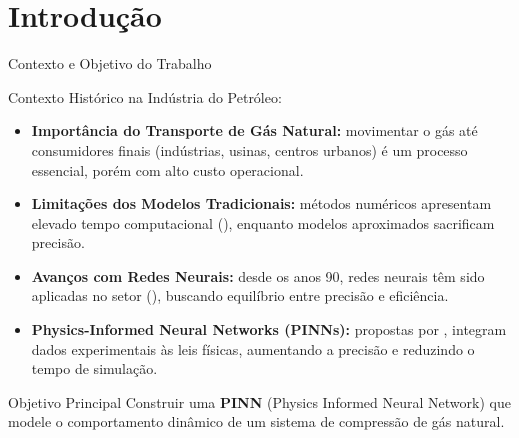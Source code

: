\section{Introdução}

\begin{frame}{Contexto e Objetivo do Trabalho}
    \scriptsize
    \begin{block}{Contexto Histórico na Indústria do Petróleo:}
    \begin{itemize}
        \item \textbf{Importância do Transporte de Gás Natural:}
        movimentar o gás até consumidores finais (indústrias, usinas, centros urbanos) é um processo essencial, porém com alto custo operacional.

        \item \textbf{Limitações dos Modelos Tradicionais:}
        métodos numéricos apresentam elevado tempo computacional (\cite{MARFATIA2022100030}), enquanto modelos aproximados sacrificam precisão.

        \item \textbf{Avanços com Redes Neurais:}
        desde os anos 90, redes neurais têm sido aplicadas no setor (\cite{Mohaghegh1996}), buscando equilíbrio entre precisão e eficiência.

        \item \textbf{Physics-Informed Neural Networks (PINNs):}
        propostas por \cite{Raissi2017}, integram dados experimentais às leis físicas, aumentando a precisão e reduzindo o tempo de simulação.
    \end{itemize}
    \end{block}
    \vspace{0.4cm}

    \begin{block}{Objetivo Principal}
        Construir uma \textbf{PINN} (Physics Informed Neural Network) que modele o comportamento dinâmico de um sistema de compressão de gás natural.
    \end{block}
\end{frame}

